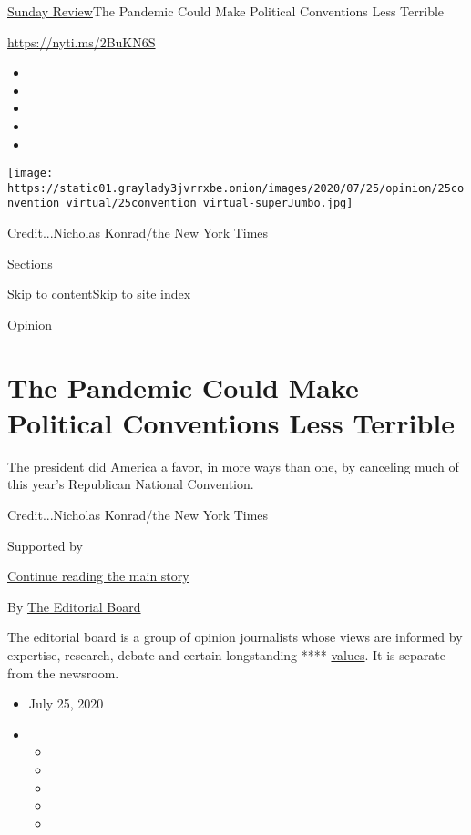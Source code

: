 \href{/section/opinion/sunday}{Sunday Review}\textbar{}The Pandemic
Could Make Political Conventions Less Terrible

\url{https://nyti.ms/2BuKN6S}

\begin{itemize}
\item
\item
\item
\item
\item
\end{itemize}

\texttt{[image: https://static01.graylady3jvrrxbe.onion/images/2020/07/25/opinion/25convention\_virtual/25convention\_virtual-superJumbo.jpg]}

Credit...Nicholas Konrad/the New York Times

Sections

\protect\hyperlink{site-content}{Skip to
content}\protect\hyperlink{site-index}{Skip to site index}

\href{/section/opinion}{Opinion}

\hypertarget{the-pandemic-could-make-political-conventions-less-terrible}{%
\section{The Pandemic Could Make Political Conventions Less
Terrible}\label{the-pandemic-could-make-political-conventions-less-terrible}}

The president did America a favor, in more ways than one, by canceling
much of this year's Republican National Convention.

Credit...Nicholas Konrad/the New York Times

Supported by

\protect\hyperlink{after-sponsor}{Continue reading the main story}

By
\href{https://www.nytimes3xbfgragh.onion/interactive/opinion/editorialboard.html}{The
Editorial Board}

The editorial board is a group of opinion journalists whose views are
informed by expertise, research, debate and certain longstanding ****
\href{https://www.nytimes3xbfgragh.onion/interactive/2018/opinion/editorialboard.html?module=inline}{values}.
It is separate from the newsroom.

\begin{itemize}
\item
  July 25, 2020
\item
  \begin{itemize}
  \item
  \item
  \item
  \item
  \item
  \end{itemize}
\end{itemize}

